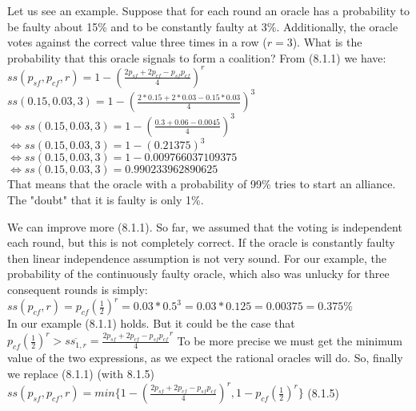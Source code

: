 \documentclass{article}
\begin{document}
\par Let us see an example. Suppose that for each round an oracle has a probability to be faulty about 15\% and to be constantly faulty at 3\%. Additionally, the oracle votes against the correct value three times in a row ($r=3$). What is the probability that this oracle signals to form a coalition? From (8.1.1) we have:\\
$ss(p_{sf},p_{cf},r)=1-(\frac{2p_{sf}+2p_{cf}-p_{sf}p_{cf}}{4})^r$\\
$ss(0.15,0.03,3)=1-(\frac{2*0.15+2*0.03-0.15*0.03}{4})^3$\\
$\Leftrightarrow ss(0.15,0.03,3)=1-(\frac{0.3+0.06-0.0045}{4})^3$\\
$\Leftrightarrow ss(0.15,0.03,3)=1-(0.21375)^3$\\
$\Leftrightarrow ss(0.15,0.03,3)=1-0.009766037109375$\\
$\Leftrightarrow ss(0.15,0.03,3)=0.990233962890625$\\
That means that the oracle with a probability of 99\% tries to start an alliance. The "doubt" that it is faulty is only 1\%.\\
\par We can improve more (8.1.1). So far, we assumed that the voting is independent each round, but this is not completely correct. If the oracle is constantly faulty then linear independence assumption is not very sound. For our example, the probability of the continuously faulty oracle, which also was unlucky for three consequent rounds is simply:\\
$ss(p_{cf},r)=p_{cf}(\frac{1}{2})^r=0.03*0.5^3=0.03*0.125=0.00375=0.375\%$\\
In our example (8.1.1) holds. But it could be the case that $p_{cf}(\frac{1}{2})^r>\overline{ss_{1,r}}=\frac{2p_{sf}+2p_{cf}-p_{sf}p_{cf}}{4}^r$ To be more precise we must get the minimum value of the two expressions, as we expect the rational oracles will do. So, finally we replace (8.1.1) (with 8.1.5)\\
\label{sec:815}
$ss(p_{sf},p_{cf},r)=min \{1-(\frac{2p_{sf}+2p_{cf}-p_{sf}p_{cf}}{4})^r, 1-p_{cf}(\frac{1}{2})^r \}$ (8.1.5)
\end{document}
